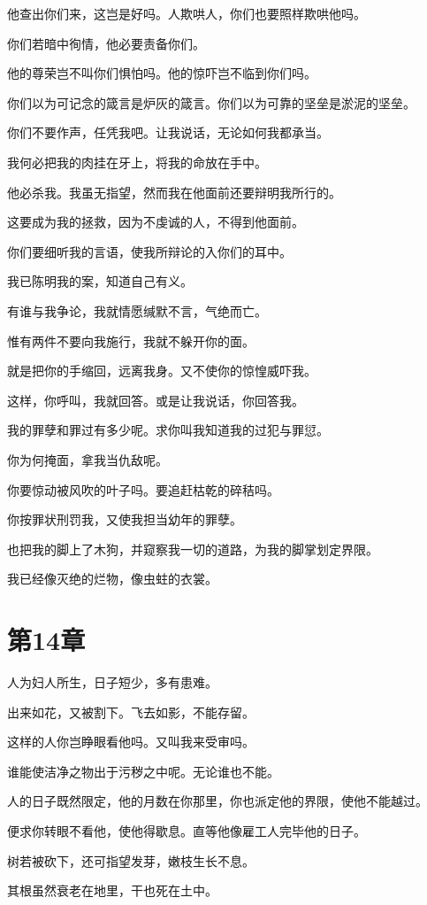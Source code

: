 \documentclass[12pt,oneside]{book}
\begin{document}
他查出你们来，这岂是好吗。人欺哄人，你们也要照样欺哄他吗。

你们若暗中徇情，他必要责备你们。

他的尊荣岂不叫你们惧怕吗。他的惊吓岂不临到你们吗。

你们以为可记念的箴言是炉灰的箴言。你们以为可靠的坚垒是淤泥的坚垒。

你们不要作声，任凭我吧。让我说话，无论如何我都承当。

我何必把我的肉挂在牙上，将我的命放在手中。

他必杀我。我虽无指望，然而我在他面前还要辩明我所行的。

这要成为我的拯救，因为不虔诚的人，不得到他面前。

你们要细听我的言语，使我所辩论的入你们的耳中。

我已陈明我的案，知道自己有义。

有谁与我争论，我就情愿缄默不言，气绝而亡。

惟有两件不要向我施行，我就不躲开你的面。

就是把你的手缩回，远离我身。又不使你的惊惶威吓我。

这样，你呼叫，我就回答。或是让我说话，你回答我。

我的罪孽和罪过有多少呢。求你叫我知道我的过犯与罪愆。

你为何掩面，拿我当仇敌呢。

你要惊动被风吹的叶子吗。要追赶枯乾的碎秸吗。

你按罪状刑罚我，又使我担当幼年的罪孽。

也把我的脚上了木狗，并窥察我一切的道路，为我的脚掌划定界限。

我已经像灭绝的烂物，像虫蛀的衣裳。



\chapter{第14章}
人为妇人所生，日子短少，多有患难。

出来如花，又被割下。飞去如影，不能存留。

这样的人你岂睁眼看他吗。又叫我来受审吗。

谁能使洁净之物出于污秽之中呢。无论谁也不能。

人的日子既然限定，他的月数在你那里，你也派定他的界限，使他不能越过。

便求你转眼不看他，使他得歇息。直等他像雇工人完毕他的日子。

树若被砍下，还可指望发芽，嫩枝生长不息。

其根虽然衰老在地里，干也死在土中。
\end{document}
